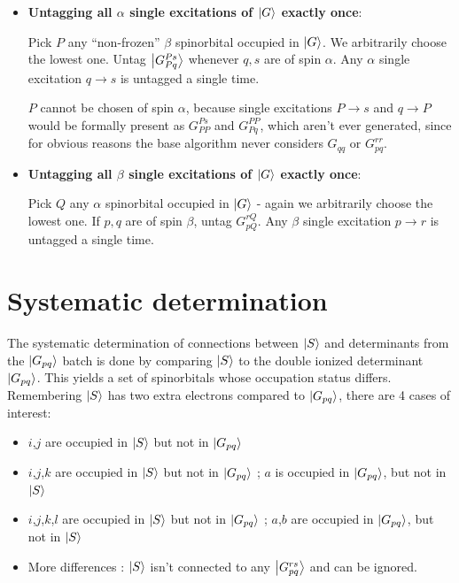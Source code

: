 \documentclass[./thesis.tex]{subfiles}
\begin{document}
\begin{itemize}
\item
\textbf{Untagging all $\alpha$ single excitations of $\ket G$ exactly once}:

Pick $P$ any ``non-frozen'' $\beta$ spinorbital occupied in $\ket G$. We arbitrarily choose the lowest one. Untag $\ket {G_{Pq}^{Ps}}$ whenever $q,s$ are of spin $\alpha$. Any $\alpha$ single excitation $q \rightarrow  s$ is untagged a single time.

$P$ cannot be chosen of spin $\alpha$, because single excitations $P \rightarrow  s$ and $q \rightarrow  P$ would be formally present as $G_{PP}^{Ps}$ and $G_{Pq}^{PP}$, which aren't ever generated, since for obvious reasons the base algorithm never considers $G_{qq}$ or $G_{pq}^{rr}$.
\item
\textbf{Untagging all $\beta$ single excitations of $\ket G$ exactly once}:

Pick $Q$ any $\alpha$ spinorbital occupied in $\ket G$ - again we arbitrarily choose the lowest one. If $p,q$ are of spin $\beta$, untag $G_{pQ}^{rQ}$. Any $\beta$ single excitation $p \rightarrow  r$ is untagged a single time.
\end{itemize}


\section{Systematic determination}

The systematic determination of connections between $\ket S$ and determinants from the $\ket {G_{pq}}$ batch is done by comparing $\ket S$ to the double ionized determinant $\ket {G_{pq}}$. This yields a set of spinorbitals whose occupation status differs. Remembering $\ket S$ has two extra electrons compared to $\ket {G_{pq}}$, there are 4 cases of interest:
\begin{itemize}

\item
$i$,$j$ are occupied in $\ket S$ but not in $\ket {G_{pq}}$
\item
$i$,$j$,$k$ are occupied in $\ket S$ but not in $\ket {G_{pq}}$ ; $a$ is occupied in $\ket {G_{pq}}$, but not in $\ket S$
\item
$i$,$j$,$k$,$l$ are occupied in $\ket S$ but not in $\ket {G_{pq}}$ ; $a$,$b$ are occupied in $\ket {G_{pq}}$, but not in $\ket S$
\item
More differences : $\ket S$ isn't connected to any $\ket {G_{pq}^{rs}}$ and can be ignored. 

\end{itemize}
\end{document}
